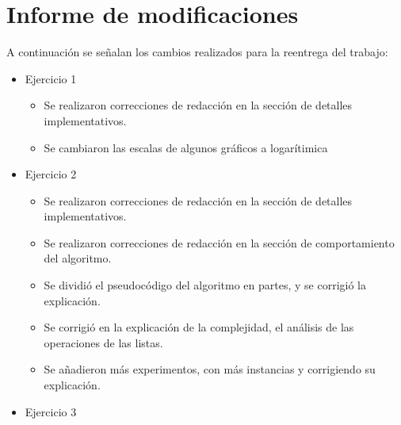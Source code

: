 \section{Informe de modificaciones}

A continuación se señalan los cambios realizados para la reentrega del trabajo:

\begin{itemize}
	\item{
		Ejercicio 1
		\begin{itemize}
			\item Se realizaron correcciones de redacción en la sección de detalles implementativos.
			\item Se cambiaron las escalas de algunos gráficos a logarítimica
		\end{itemize}
	}
	\item{
		Ejercicio 2
		\begin{itemize}
			\item Se realizaron correcciones de redacción en la sección de detalles implementativos.			
			\item Se realizaron correcciones de redacción en la sección de comportamiento del algoritmo.
			\item Se dividió el pseudocódigo del algoritmo en partes, y se corrigió la explicación. 
			\item Se corrigió en la explicación de la complejidad, el análisis de las operaciones de las listas. 
			\item Se añadieron más experimentos, con más instancias y corrigiendo su explicación. 
		\end{itemize}
	}
	\item{
		Ejercicio 3
		\begin{itemize}
		\end{itemize}
	}
\end{itemize}
